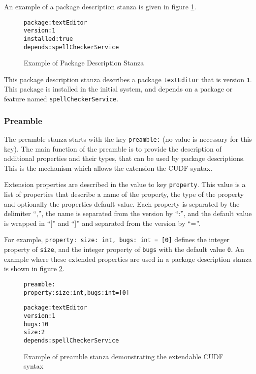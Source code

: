 An example of a package description stanza is given in figure \ref{formal.cudfpdstanza}.
\begin{figure}[htp] 
\begin{center}
\begin{alltt}
package: textEditor
version: 1
installed: true
depends: spellCheckerService
\end{alltt}
  \caption{Example of Package Description Stanza}
  \label{formal.cudfpdstanza}
\end{center}
\end{figure}
This package description stanza describes a package \texttt{textEditor} that is version \texttt{1}.
This package is installed in the initial system, and depends on a package or feature named \texttt{spellCheckerService}. 

\subsubsection{Preamble}
\label{cudf.preambledes}
The preamble stanza starts with the key \verb+preamble:+ (no value is necessary for this key).
The main function of the preamble is to provide the description of additional properties and their types, that can be used by package descriptions.
This is the mechanism which allows the extension the CUDF syntax.

Extension properties are described in the value to key \verb+property+.
This value is a list of properties that describe a name of the property, the type of the property and optionally the properties default value.
Each property is separated by the delimiter ``,'', the name is separated from the version by ``:'', and the default value is wrapped in ``['' and ``]'' and separated from the version by ``=''.

For example, \verb+property: size: int, bugs: int = [0]+ defines the integer property of \verb+size+, and the integer property of \verb+bugs+ with the default value \verb+0+.
An example where these extended properties are used in a package description stanza is shown in figure \ref{formal.cudfextensionexample}.

\begin{figure}[htp] 
\begin{center}
\begin{alltt}
preamble:
property: size: int, bugs: int = [0]

package: textEditor
version: 1
bugs: 10
size: 2
depends: spellCheckerService

\end{alltt}
  \caption{Example of preamble stanza demonstrating the extendable CUDF syntax}
  \label{formal.cudfextensionexample}
\end{center}
\end{figure}

